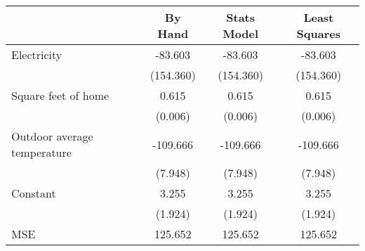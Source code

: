 \begin{tabular}{lccc}
\toprule
{} &    By Hand & Stats Model & Least Squares \\
\midrule
Electricity                 &    -83.603 &     -83.603 &       -83.603 \\
                            &  (154.360) &   (154.360) &     (154.360) \\
Square feet of home         &      0.615 &       0.615 &         0.615 \\
                            &    (0.006) &     (0.006) &       (0.006) \\
Outdoor average temperature &   -109.666 &    -109.666 &      -109.666 \\
                            &    (7.948) &     (7.948) &       (7.948) \\
Constant                    &      3.255 &       3.255 &         3.255 \\
                            &    (1.924) &     (1.924) &       (1.924) \\
MSE                         &    125.652 &     125.652 &       125.652 \\
\bottomrule
\end{tabular}
